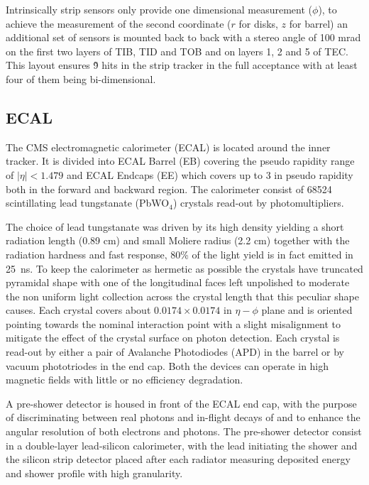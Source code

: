 Intrinsically strip sensors only provide one dimensional measurement ($\phi$), to achieve the measurement of the second coordinate ($r$ for disks, $z$ for barrel) an additional set of sensors is mounted back to back with a stereo angle of 100 mrad on the first two layers of TIB, TID and TOB and on layers 1, 2 and 5 of TEC. This layout ensures \~9 hits in the strip tracker in the full acceptance with at least four of them being bi-dimensional.


\subsection{ECAL}

The CMS electromagnetic calorimeter (ECAL) is located around the inner tracker. It is divided into ECAL Barrel (EB) covering the pseudo rapidity range of $|\eta| < 1.479$ and ECAL Endcaps (EE) which covers up to 3 in pseudo rapidity both in the forward and backward region. 
The calorimeter consist of 68524 scintillating lead tungstanate (PbWO$_4$) crystals read-out by photomultipliers. 

The choice of lead tungstanate was driven by its high density yielding a short radiation length (0.89 cm) and small Moliere radius (2.2 cm) together with the radiation hardness and fast response, 80\% of the light yield is in fact emitted in 25~ns. To keep the calorimeter as hermetic as possible the crystals have truncated pyramidal shape with one of the longitudinal faces left unpolished to moderate the non uniform light collection across the crystal length that this peculiar shape causes. Each crystal covers about $0.0174 \times 0.0174$ in $\eta-\phi$ plane and is oriented pointing towards the nominal interaction point with a slight misalignment to mitigate the effect of the crystal surface on photon detection. Each crystal is read-out by either a pair of Avalanche Photodiodes (APD) in the barrel or by vacuum phototriodes in the end cap. Both the devices can operate in high magnetic fields with little or no efficiency degradation. 

A pre-shower detector is housed in front of the ECAL end cap, with the purpose of discriminating between real photons and in-flight decays of \piz and to enhance the angular resolution of both electrons and photons. The pre-shower detector consist in a double-layer lead-silicon calorimeter, with the lead initiating the shower and the silicon strip detector placed after each radiator measuring deposited energy and shower profile with high granularity.


